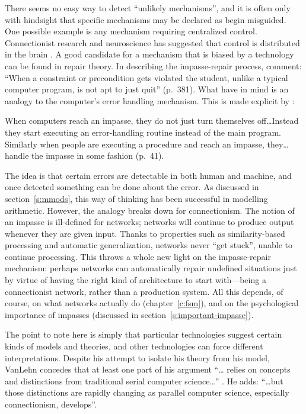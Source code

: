 There seems no easy way to detect ``unlikely mechanisms'', and it is often
only with hindsight that specific mechanisms may be declared as begin
misguided.  One possible example is any mechanism requiring centralized
control.  Connectionist research and neuroscience has suggested that control
is distributed in the brain \cite[pp.~134--135]{pdp:4}.  A good candidate
for a mechanism that is biased by a technology can be found in repair
theory.  In describing the impasse-repair process,  comment:
``When a constraint or precondition gets violated the student, unlike a
typical computer program, is not apt to just quit'' (p.~381).  What
\citeauthor{repair} have in mind is an analogy to the computer's error
handling mechanism. This is made explicit by :
\begin{ssquote}
%
When computers reach an impasse, they do not just turn themselves
off\ldots Instead they start executing an error-handling routine instead of
the main program. Similarly when people are executing a procedure and reach
an impasse, they\ldots handle the impasse in some fashion (p.~41).
\end{ssquote}
The idea is that certain errors are detectable in both human and machine,
and once detected something can be done about the error.  As discussed in
section~\ref{s:mmods}, this way of thinking has been successful in modelling
arithmetic.  However, the analogy breaks down for connectionism.  The
notion of an impasse is ill-defined for networks; networks
will continue to produce output whenever
they are given input.  Thanks to properties
such as similarity-based processing and automatic generalization, networks
never ``get stuck'', unable to continue processing.  This throws a whole
new light on the impasse-repair mechanism: perhaps networks can
automatically repair undefined situations just by virtue of having the
right kind of architecture to start with---being a connectionist
network, rather than a production system.  All this depends, of course, on
what networks actually do (chapter~\ref{c:fsm}), and on the psychological
importance of impasses (discussed in section~\ref{s:important-impasse}).

The point to note here is simply that particular technologies suggest
certain kinds of models and theories, and other technologies can force
different interpretations. Despite his attempt to isolate his theory from
his model, VanLehn concedes that at least one part of his argument ``\ldots
relies on concepts and distinctions from traditional serial computer
science\ldots'' \cite[p.~212]{mindbugs}. He adds: ``\ldots but those
distinctions are rapidly changing as parallel computer science, especially
connectionism, develops''.





